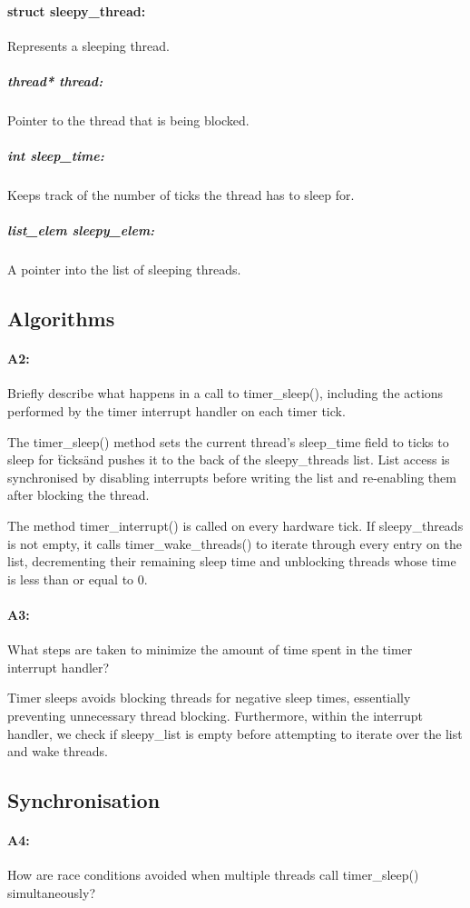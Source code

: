 \documentclass[11pt]{article}
\begin{document}
\paragraph{struct sleepy\_thread:}
Represents a sleeping thread.

\subparagraph{thread* thread:}
Pointer to the thread that is being blocked.
\subparagraph{int sleep\_time:}
Keeps track of the number of ticks the thread has to sleep for.
\subparagraph{list\_elem sleepy\_elem:}
A pointer into the list of sleeping threads.

\subsection{Algorithms}
\paragraph{A2:}
Briefly describe what happens in a call to timer\_sleep(), including the actions performed by the timer interrupt handler on each timer tick.

The timer\_sleep() method sets the current thread's sleep\_time field to ticks to sleep for \"ticks\" and pushes it to the back of the sleepy\_threads list. List access is synchronised by disabling interrupts before writing the list and re-enabling them after blocking the thread.

The method timer\_interrupt() is called on every hardware tick. If sleepy\_threads is not empty, it calls timer\_wake\_threads() to iterate through every entry on the list, decrementing their remaining sleep time and unblocking threads whose time is less than or equal to 0.

\paragraph{A3:}
What steps are taken to minimize the amount of time spent in the timer interrupt handler?

Timer sleeps avoids blocking threads for negative sleep times, essentially preventing unnecessary thread blocking. Furthermore, within the interrupt handler, we check if sleepy\_list is empty before attempting to iterate over the list and wake threads.

\subsection{Synchronisation}
\paragraph{A4:}
How are race conditions avoided when multiple threads call timer\_sleep() simultaneously?
\end{document}
